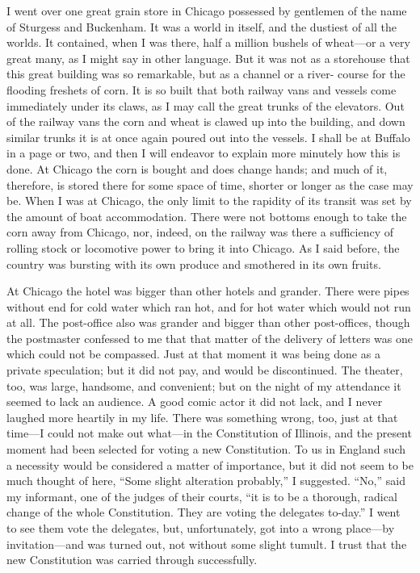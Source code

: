 I went over one great grain store in Chicago possessed by gentlemen
of the name of Sturgess and Buckenham.  It was a world in itself,
and the dustiest of all the worlds.  It contained, when I was
there, half a million bushels of wheat---or a very great many, as I
might say in other language.  But it was not as a storehouse that
this great building was so remarkable, but as a channel or a river-
course for the flooding freshets of corn.  It is so built that both
railway vans and vessels come immediately under its claws, as I may
call the great trunks of the elevators.  Out of the railway vans
the corn and wheat is clawed up into the building, and down similar
trunks it is at once again poured out into the vessels.  I shall be
at Buffalo in a page or two, and then I will endeavor to explain
more minutely how this is done.  At Chicago the corn is bought and
does change hands; and much of it, therefore, is stored there for
some space of time, shorter or longer as the case may be.  When I
was at Chicago, the only limit to the rapidity of its transit was
set by the amount of boat accommodation.  There were not bottoms
enough to take the corn away from Chicago, nor, indeed, on the
railway was there a sufficiency of rolling stock or locomotive
power to bring it into Chicago.  As I said before, the country was
bursting with its own produce and smothered in its own fruits.

At Chicago the hotel was bigger than other hotels and grander.
There were pipes without end for cold water which ran hot, and for
hot water which would not run at all.  The post-office also was
grander and bigger than other post-offices, though the postmaster
confessed to me that that matter of the delivery of letters was one
which could not be compassed.  Just at that moment it was being
done as a private speculation; but it did not pay, and would be
discontinued.  The theater, too, was large, handsome, and
convenient; but on the night of my attendance it seemed to lack an
audience.  A good comic actor it did not lack, and I never laughed
more heartily in my life.  There was something wrong, too, just at
that time---I could not make out what---in the Constitution of
Illinois, and the present moment had been selected for voting a new
Constitution.  To us in England such a necessity would be
considered a matter of importance, but it did not seem to be much
thought of here, ``Some slight alteration probably,'' I suggested.
``No,'' said my informant, one of the judges of their courts, ``it is
to be a thorough, radical change of the whole Constitution.  They
are voting the delegates to-day.''  I went to see them vote the
delegates, but, unfortunately, got into a wrong place---by
invitation---and was turned out, not without some slight tumult.  I
trust that the new Constitution was carried through successfully.

